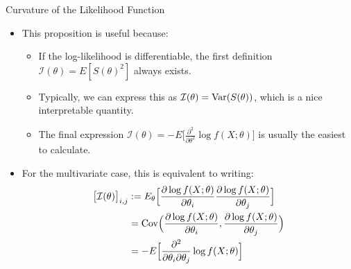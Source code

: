 \begin{frame}[allowframebreaks]{Curvature of the Likelihood Function}
\begin{itemize}
\begin{block}{Proposition: Variance of the Score}
{\begin{proof}
        \begin{align*}
          E\Big[\frac{\partial^2}{\partial \theta^2} \log f(X;\theta)\Big] &= E\Big[\frac{\frac{\partial^2}{\partial \theta^2}f(X;\theta)}{f(X;\theta)}\Big] - E\Big[\Big(\frac{\partial}{\partial \theta} \log f(X; \theta)\Big)^2\Big] \\
          &= - E\Big[\Big(\frac{\partial}{\partial \theta} \log f(X; \theta)\Big)^2\Big],
        \end{align*}
        where the last inequality is a result of the previously derived identity
        $$
        E\Big[\frac{\frac{\partial^2}{\partial\theta^2}f(X;\theta)}{f(X;\theta)}\Big] = 0.
        $$
        Thus, we have proven the statement
        $$
        \mathcal{I}(\theta) = \Var\big(S(\theta)\big) = -E\Big[\frac{\partial^2}{\partial \theta^2} \log f(X;\theta)\Big].
        $$
      \end{proof}
    }

  \end{block}

  \framebreak

  \item This proposition is useful because:
  \begin{itemize}
    \item If the log-likelihood is differentiable, the first definition $\mathcal{I}(\theta) = E[S(\theta)^2]$ always exists.
    \item Typically, we can express this as $\mathcal{I}(\theta) = \mathrm{Var}(S(\theta))$, which is a nice interpretable quantity.
    \item The final expression $\mathcal{I}(\theta) = -E\Big[\frac{\partial^2}{\partial \theta^2} \log f(X;\theta)\Big]$ is usually the easiest to calculate.
  \end{itemize}

  \item For the multivariate case, this is equivalent to writing:
      \begin{align*}
      \big[\mathcal{I}(\theta)\big]_{i,j} &:= E_\theta\Big[\frac{\partial \log f(X; \theta)}{\partial \theta_i}\frac{\partial \log f(X; \theta)}{\partial \theta_j}\Big] \\
      &= \mathrm{Cov}\Big(\frac{\partial \log f(X; \theta)}{\partial \theta_i}, \frac{\partial \log f(X; \theta)}{\partial \theta_j}\Big) \\
      &= -E\Big[\frac{\partial^2}{\partial \theta_i \partial \theta_j} \log f(X;\theta)\Big]
      \end{align*}


\end{itemize}
\end{frame}
